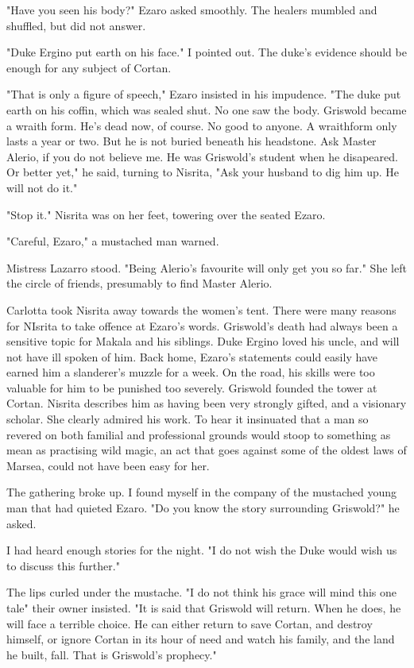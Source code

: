\documentclass{article}
\begin{document}
"Have you seen his body?" Ezaro asked smoothly. The healers mumbled and shuffled, but did not answer.

"Duke Ergino put earth on his face." I pointed out. The duke's evidence should be enough for any subject of Cortan.

"That is only a figure of speech," Ezaro insisted in his impudence. "The duke put earth on his coffin, which was sealed shut. No one saw the body. Griswold became a wraith form. He's dead now, of course. No good to anyone. A wraithform only lasts a year or two. But he is not buried beneath his headstone. Ask Master Alerio, if you do not believe me. He was Griswold's student when he disapeared. Or better yet," he said, turning to Nisrita, "Ask your husband to dig him up. He will not do it."

"Stop it." Nisrita was on her feet, towering over the seated Ezaro. 

"Careful, Ezaro," a mustached man warned.

Mistress Lazarro stood. "Being Alerio's favourite will only get you so far." She left the circle of friends, presumably to find Master Alerio.

Carlotta took Nisrita away towards the women's tent. There were many reasons for NIsrita to take offence at Ezaro's words. Griswold's death had always been a sensitive topic for Makala and his siblings. Duke Ergino loved his uncle, and will not have ill spoken of him. Back home, Ezaro's statements could easily have earned him a slanderer's muzzle for a week. On the road, his skills were too valuable for him to be punished too severely. Griswold founded the tower at Cortan. Nisrita describes him as having been very strongly gifted, and a visionary scholar. She clearly admired his work. To hear it insinuated that a man so revered on both familial and professional grounds would stoop to something as mean as practising wild magic, an act that goes against some of the oldest laws of Marsea, could not have been easy for her.

The gathering broke up. I found myself in the company of the mustached young man that had quieted Ezaro. "Do you know the story surrounding Griswold?" he asked. 

I had heard enough stories for the night. "I do not wish the Duke would wish us to discuss this further."

The lips curled under the mustache. "I do not think his grace will mind this one tale" their owner insisted. "It is said that Griswold will return. When he does, he will face a terrible choice. He can either return to save Cortan, and destroy himself, or ignore Cortan in its hour of need and watch his family, and the land he built, fall. That is Griswold's prophecy."
\end{document}
